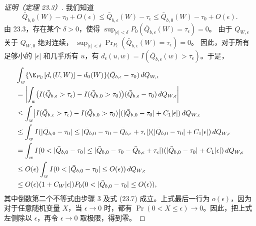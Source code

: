 \begin{proof}[证明（定理 23.3）]
我们知道
\[
 \bar Q_{b,0}(W)-\tau_0+O(\epsilon)\leq\bar Q_{b,\epsilon}(W)-\tau_\epsilon
 \leq\bar Q_{b,0}(W)-\tau_0+O(\epsilon).
\]
由 23.3，存在某个 $\delta>0$，使得
$\sup_{|\epsilon|<\delta}P_0(\bar Q_{b,\epsilon}(W)=\tau_\epsilon)=0$。
由于 $Q_{W,\epsilon}$ 关于 $Q_{W,0}$ 绝对连续，
$\sup_{|\epsilon|<\delta}\Pr_{P_\epsilon}(\bar Q_{b,\epsilon}(W)=\tau_\epsilon)=0$。
因此，对于所有足够小的 $|\epsilon|$ 和几乎所有 $u$，有
$d_\epsilon(u,w)=I(\bar Q_{b,\epsilon}(w)>\tau_\epsilon)$。于是，
\[
\begin{aligned}
 &\int_w\{\E_{P_U}[d_\epsilon(U,W)]-d_0(W)\}(\bar Q_{b,\epsilon}-\tau_0)\,dQ_{W,\epsilon}\\
 &=\left|\int_w\bigl(I(\bar Q_{b,\epsilon}>\tau_\epsilon)-I(\bar Q_{b,0}>\tau_0)\bigr)
 (\bar Q_{b,\epsilon}-\tau_0)\,dQ_{W,\epsilon}\right|\\
 &\leq\int_w\bigl|I(\bar Q_{b,\epsilon}>\tau_\epsilon)-I(\bar Q_{b,0}>\tau_0)\bigr|
 (|\bar Q_{b,0}-\tau_0|+C_1|\epsilon|)\,dQ_{W,\epsilon}\\
 &\leq\int_w I(|\bar Q_{b,0}-\tau_0|\leq|\bar Q_{b,0}-\tau_0-\bar Q_{b,\epsilon}+\tau_\epsilon|)
 (|\bar Q_{b,0}-\tau_0|+C_1|\epsilon|)\,dQ_{W,\epsilon}\\
 &=\int_w I(0<|\bar Q_{b,0}-\tau_0|\leq|\bar Q_{b,0}-\tau_0-\bar Q_{b,\epsilon}+\tau_\epsilon|)
 (|\bar Q_{b,0}-\tau_0|+C_1|\epsilon|)\,dQ_{W,\epsilon}\\
 &\leq O(\epsilon)\int_w I(0<|\bar Q_{b,0}-\tau_0|\leq O(\epsilon))\,dQ_{W,\epsilon}\\
 &\leq O(\epsilon)(1+C_W|\epsilon|)P_0(0<|\bar Q_{b,0}-\tau_0|\leq O(\epsilon)),
\end{aligned}
\]
其中倒数第二个不等式由步骤 3 及式 (23.7) 成立。上式最后一行为 $o(\epsilon)$，因为对于任意随机变量 $X$，当 $\epsilon\to0$ 时，都有 $\Pr(0<X\leq\epsilon)\to0$。因此，把上式左侧除以 $\epsilon$，再令 $\epsilon\to0$ 取极限，得到零。
\end{proof}
